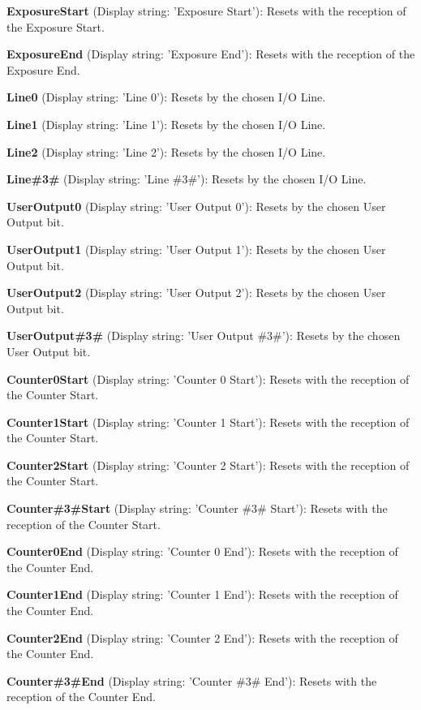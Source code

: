 \begin{DoxyItemize}
\item {\bfseries Exposure\+Start} (Display string\+: 'Exposure Start')\+: Resets with the reception of the Exposure Start.
\item {\bfseries Exposure\+End} (Display string\+: 'Exposure End')\+: Resets with the reception of the Exposure End.
\item {\bfseries Line0} (Display string\+: 'Line 0')\+: Resets by the chosen I/\+O Line.
\item {\bfseries Line1} (Display string\+: 'Line 1')\+: Resets by the chosen I/\+O Line.
\item {\bfseries Line2} (Display string\+: 'Line 2')\+: Resets by the chosen I/\+O Line.
\item {\bfseries Line\#3\#} (Display string\+: 'Line \#3\#')\+: Resets by the chosen I/\+O Line.
\item {\bfseries User\+Output0} (Display string\+: 'User Output 0')\+: Resets by the chosen User Output bit.
\item {\bfseries User\+Output1} (Display string\+: 'User Output 1')\+: Resets by the chosen User Output bit.
\item {\bfseries User\+Output2} (Display string\+: 'User Output 2')\+: Resets by the chosen User Output bit.
\item {\bfseries User\+Output\#3\#} (Display string\+: 'User Output \#3\#')\+: Resets by the chosen User Output bit.
\item {\bfseries Counter0\+Start} (Display string\+: 'Counter 0 Start')\+: Resets with the reception of the Counter Start.
\item {\bfseries Counter1\+Start} (Display string\+: 'Counter 1 Start')\+: Resets with the reception of the Counter Start.
\item {\bfseries Counter2\+Start} (Display string\+: 'Counter 2 Start')\+: Resets with the reception of the Counter Start.
\item {\bfseries Counter\#3\#Start} (Display string\+: 'Counter \#3\# Start')\+: Resets with the reception of the Counter Start.
\item {\bfseries Counter0\+End} (Display string\+: 'Counter 0 End')\+: Resets with the reception of the Counter End.
\item {\bfseries Counter1\+End} (Display string\+: 'Counter 1 End')\+: Resets with the reception of the Counter End.
\item {\bfseries Counter2\+End} (Display string\+: 'Counter 2 End')\+: Resets with the reception of the Counter End.
\item {\bfseries Counter\#3\#End} (Display string\+: 'Counter \#3\# End')\+: Resets with the reception of the Counter End.

\end{DoxyItemize}
